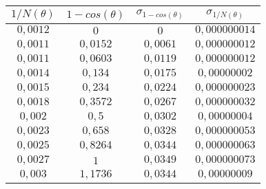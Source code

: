 \begin{tabular}{| c | c | c | c |}
\hline
$1/N(\theta)$ & $1 - cos(\theta)$ & $\sigma_{1 - cos(\theta)}$ & $\sigma_{1/N(\theta)}$\\
\hline
$0,0012$ & $0$ & $0$ & $0,000000014$\\
\hline
$0,0011$ & $0,0152$ & $0,0061$ & $0,000000012$\\
\hline
$0,0011$ & $0,0603$ & $0,0119$ & $0,000000012$\\
\hline
$0,0014$ & $0,134$ & $0,0175$ & $0,00000002$\\
\hline
$0,0015$ & $0,234$ & $0,0224$ & $0,000000023$\\
\hline
$0,0018$ & $0,3572$ & $0,0267$ & $0,000000032$\\
\hline
$0,002$ & $0,5$ & $0,0302$ & $0,00000004$\\
\hline
$0,0023$ & $0,658$ & $0,0328$ & $0,000000053$\\
\hline
$0,0025$ & $0,8264$ & $0,0344$ & $0,000000063$\\
\hline
$0,0027$ & $1$ & $0,0349$ & $0,000000073$\\
\hline
$0,003$ & $1,1736$ & $0,0344$ & $0,00000009$\\
\hline
\end{tabular}
